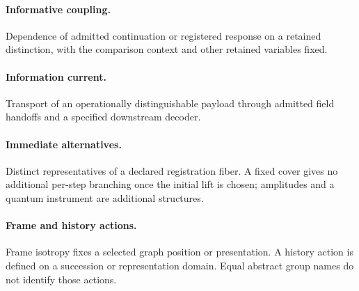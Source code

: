 \paragraph{Informative coupling.} Dependence of admitted continuation or registered response on a retained distinction, with the comparison context and other retained variables fixed.
\paragraph{Information current.} Transport of an operationally distinguishable payload through admitted field handoffs and a specified downstream decoder.
\paragraph{Immediate alternatives.} Distinct representatives of a declared registration fiber. A fixed cover gives no additional per-step branching once the initial lift is chosen; amplitudes and a quantum instrument are additional structures.
\paragraph{Frame and history actions.} Frame isotropy fixes a selected graph position or presentation. A history action is defined on a succession or representation domain. Equal abstract group names do not identify those actions.
